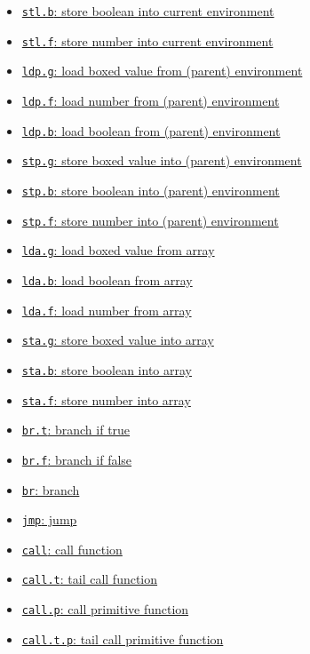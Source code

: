 \documentclass[11pt]{article}
\begin{document}
\begin{itemize}
\begin{itemize}
\begin{itemize}
{store boxed value into current environment}
\item \hyperref[sec:org711619f]{\texttt{stl.b}: store
boolean into current environment}
\item \hyperref[sec:org29b23b4]{\texttt{stl.f}: store
number into current environment}
\item \hyperref[sec:org445285b]{\texttt{ldp.g}: load
boxed value from (parent) environment}
\item \hyperref[sec:orgf48099d]{\texttt{ldp.f}: load
number from (parent) environment}
\item \hyperref[sec:org74003ff]{\texttt{ldp.b}: load
boolean from (parent) environment}
\item \hyperref[sec:org3861b91]{\texttt{stp.g}:
store boxed value into (parent) environment}
\item \hyperref[sec:org15feb28]{\texttt{stp.b}: store
boolean into (parent) environment}
\item \hyperref[sec:org4696eef]{\texttt{stp.f}: store
number into (parent) environment}
\item \hyperref[sec:org0b3a1ff]{\texttt{lda.g}: load boxed value
from array}
\item \hyperref[sec:orgb1de169]{\texttt{lda.b}: load boolean from
array}
\item \hyperref[sec:orgdc8e9a7]{\texttt{lda.f}: load number from
array}
\item \hyperref[sec:org4724d89]{\texttt{sta.g}: store boxed value
into array}
\item \hyperref[sec:org8e9e3f6]{\texttt{sta.b}: store boolean into
array}
\item \hyperref[sec:org3dfaf54]{\texttt{sta.f}: store number into
array}
\item \hyperref[sec:orge20199f]{\texttt{br.t}: branch if true}
\item \hyperref[sec:org6c72b12]{\texttt{br.f}: branch if false}
\item \hyperref[sec:org71bb9a3]{\texttt{br}: branch}
\item \hyperref[sec:orgeb956da]{\texttt{jmp}: jump}
\item \hyperref[sec:orgc60978b]{\texttt{call}: call function}
\item \hyperref[sec:org026b562]{\texttt{call.t}: tail call function}
\item \hyperref[sec:org99bb90f]{\texttt{call.p}: call primitive
function}
\item \hyperref[sec:orgd22c74d]{\texttt{call.t.p}: tail call
primitive function}

\end{itemize}
\end{itemize}
\end{itemize}
\end{document}
